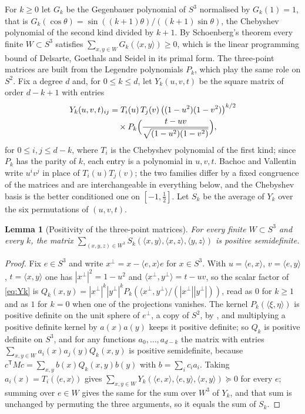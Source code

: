 \documentclass[11pt,reqno]{amsart}
\renewcommand{\_}{\origunderscore\allowbreak}
\numberwithin{equation}{section}
\theoremstyle{plain}
\newtheorem{lem}[thm]{Lemma}
\theoremstyle{definition}
\theoremstyle{remark}
\begin{document}
For $k\ge0$ let $G_k$ be the Gegenbauer polynomial of $S^3$ normalised
by $G_k(1)=1$, that is $G_k(\cos\theta)=\sin((k+1)\theta)/((k+1)\sin\theta)$,
the Chebyshev polynomial of the second kind divided by $k+1$. By
Schoenberg's theorem \cite{Sch42} every finite $W\subset S^3$ satisfies
$\sum_{x,y\in W}G_k(\langle x,y\rangle)\ge0$, which is the linear
programming bound of Delsarte, Goethals and Seidel \cite{DGS77} in its
primal form. The three-point matrices are built from the Legendre
polynomials $P_k$, which play the same role on $S^2$. Fix a degree $d$
and, for $0\le k\le d$, let $Y_k(u,v,t)$ be the square matrix of order
$d-k+1$ with entries
\begin{equation}\label{eq:Yk}
\begin{aligned}
  Y_k(u,v,t)_{ij}&=T_i(u)\,T_j(v)\,
  \bigl((1-u^2)(1-v^2)\bigr)^{k/2}\\
  &\quad\times P_k\Bigl(\frac{t-uv}{\sqrt{(1-u^2)(1-v^2)}}\Bigr),
\end{aligned}
\end{equation}
for $0\le i,j\le d-k$,
where $T_i$ is the Chebyshev polynomial of the first kind; since $P_k$
has the parity of $k$, each entry is a polynomial in $u,v,t$. Bachoc
and Vallentin write $u^iv^j$ in place of $T_i(u)T_j(v)$; the two
families differ by a fixed congruence of the matrices and are
interchangeable in everything below, and the Chebyshev basis is the
better conditioned one on $[-1,\tfrac12]$. Let $S_k$ be the average of
$Y_k$ over the six permutations of $(u,v,t)$.

\begin{lem}[Positivity of the three-point matrices]\label{lem:three-point-psd}
For every finite $W\subset S^3$ and every $k$, the matrix
$\sum_{(x,y,z)\in W^3}S_k(\langle x,y\rangle,\langle x,z\rangle,\langle y,z\rangle)$
is positive semidefinite.
\end{lem}

\begin{proof}
Fix $e\in S^3$ and write $x^\perp=x-\langle e,x\rangle e$ for $x\in S^3$.
With $u=\langle e,x\rangle$, $v=\langle e,y\rangle$, $t=\langle x,y\rangle$
one has $|x^\perp|^2=1-u^2$ and $\langle x^\perp,y^\perp\rangle=t-uv$, so
the scalar factor of \eqref{eq:Yk} is
$Q_k(x,y)=|x^\perp|^k|y^\perp|^kP_k(\langle x^\perp,y^\perp\rangle/(|x^\perp||y^\perp|))$,
read as $0$ for $k\ge1$ and as $1$ for $k=0$ when one of the projections
vanishes. The kernel $P_k(\langle\xi,\eta\rangle)$ is positive definite
on the unit sphere of $e^\perp$, a copy of $S^2$, by \cite{Sch42}, and
multiplying a positive definite kernel by $a(x)a(y)$ keeps it positive
definite; so $Q_k$ is positive definite on $S^3$, and for any functions
$a_0,\dots,a_{d-k}$ the matrix with entries
$\sum_{x,y\in W}a_i(x)a_j(y)Q_k(x,y)$ is positive semidefinite, because
$c^{\mathsf T}Mc=\sum_{x,y}b(x)Q_k(x,y)b(y)$ with $b=\sum_ic_ia_i$. Taking
$a_i(x)=T_i(\langle e,x\rangle)$ gives
$\sum_{x,y\in W}Y_k(\langle e,x\rangle,\langle e,y\rangle,\langle x,y\rangle)\succeq0$
for every $e$; summing over $e\in W$ gives the same for the sum over
$W^3$ of $Y_k$, and that sum is unchanged by permuting the three
arguments, so it equals the sum of $S_k$.
\end{proof}
\end{document}
